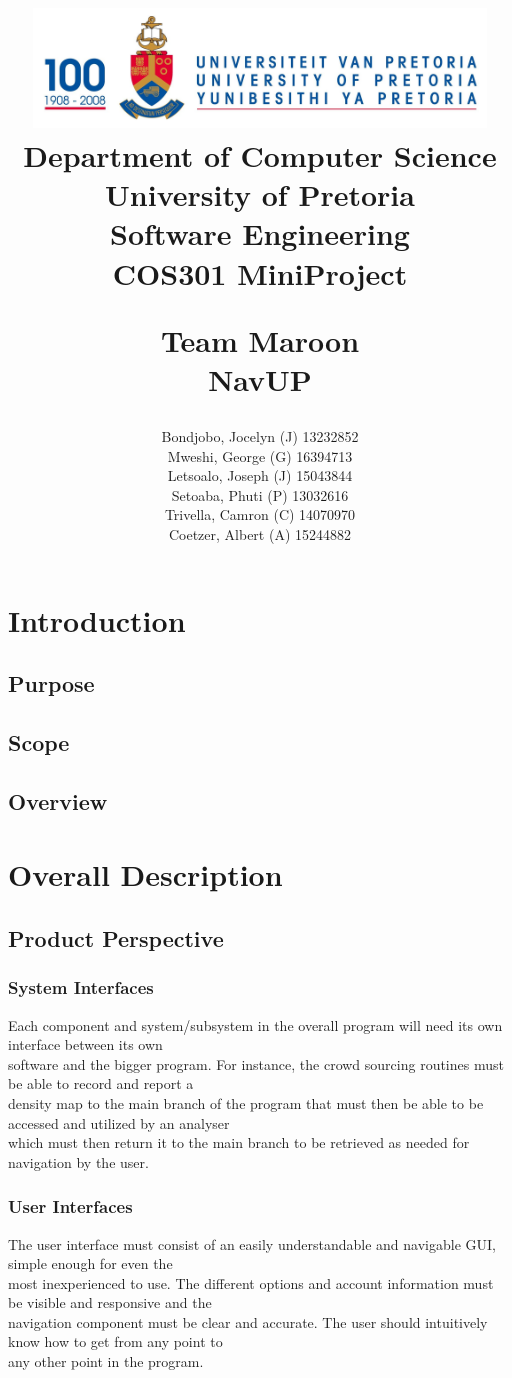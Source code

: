 \documentclass[a4paper,10pt]{article}
\title{\includegraphics[width=12cm]{Eeufeeslogo.jpg} \\
       Department of Computer Science \\
       University of Pretoria \\
       \vspace{0.5cm}
       Software Engineering\\
       COS301 MiniProject \\
       \vspace{0.5cm}
       \begin{large} \textbf{Team Maroon}\\ NavUP\end{large}}
\date{}
\author{Bondjobo, Jocelyn (J) 	13232852 		\\
		Mweshi, George (G)		16394713		\\
		Letsoalo, Joseph (J)	15043844		\\
		Setoaba, Phuti (P)		13032616		\\
		Trivella, Camron (C)	14070970		\\
		Coetzer, Albert (A)		15244882		\\
}
\begin{document}
\maketitle
\thispagestyle{empty}
\clearpage

\newpage
{}
\thispagestyle{empty}
\tableofcontents
\clearpage

\newpage
{}

\section{Introduction}

	\subsection{Purpose} 	
	\subsection{Scope} 
	\subsection{Overview} 

\section{Overall Description}

	\subsection{Product Perspective}
	
		\subsubsection{System Interfaces}
			Each component and system/subsystem in the overall program will need its own interface between its own\\				software and the bigger program. For instance, the crowd sourcing routines must be able to record and report a\\			density map to the main branch of the program that must then be able to be accessed and utilized by an analyser\\			which must then return it to the main branch to be retrieved as needed for navigation by the user.\\
		\subsubsection{User Interfaces}
			The user interface must consist of an easily understandable and navigable GUI, simple enough for even the\\				most inexperienced to use. The different options and account information must be visible and responsive and the\\			navigation component must be clear and accurate. The user should intuitively know how to get from any point to\\			any other point in the program.\\
\end{document}
